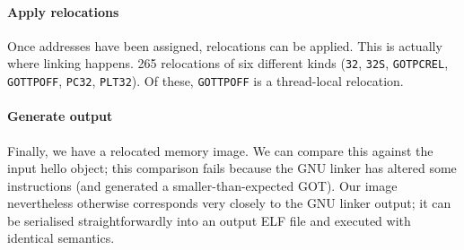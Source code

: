 \paragraph{Apply relocations} Once addresses have been assigned, relocations can be applied.
This is actually where linking happens. 
265 relocations of six different kinds (\texttt{32}, \texttt{32S}, \texttt{GOTPCREL}, 
\texttt{GOTTPOFF}, \texttt{PC32}, \texttt{PLT32}).
Of these, \texttt{GOTTPOFF} is a thread-local relocation.

\paragraph{Generate output} Finally, we have a relocated memory image.
We can compare this against the input \textsf{hello} object; this comparison fails
because the GNU linker has altered some instructions (and generated a smaller-than-expected GOT).
Our image nevertheless otherwise corresponds very closely to the GNU linker output; 
it can be serialised straightforwardly into an output ELF file and executed with identical
semantics.
